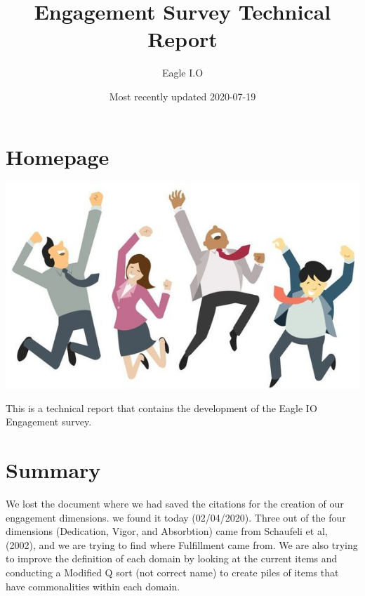 \documentclass[
]{book}
\title{Engagement Survey Technical Report}
\author{Eagle I.O}
\date{Most recently updated 2020-07-19}
\begin{document}
\maketitle

{
\setcounter{tocdepth}{1}
\tableofcontents
}
\hypertarget{Homepage}{%
\chapter*{Homepage}\label{Homepage}}

\includegraphics{EE.jpeg}

This is a technical report that contains the development of the Eagle IO Engagement survey.

\hypertarget{summary}{%
\chapter{Summary}\label{summary}}

We lost the document where we had saved the citations for the creation of our engagement dimensions. we found it today (02/04/2020).
Three out of the four dimensions (Dedication, Vigor, and Absorbtion) came from Schaufeli et al, (2002), and we are trying to find where Fulfillment came from.
We are also trying to improve the definition of each domain by looking at the current items and conducting a Modified Q sort (not correct name) to create piles of items that have commonalities within each domain.

\citet{eagly_psychology_1993}
\citeauthor{simpson_engagement_2009} \citetext{\citeyear{simpson_engagement_2009}; \citealp{harter_business_2002}; \citealp{kahn_psychological_1990}; \citealp{leiter_areas_2003}; \citealp{R-base}; \citealp{R-rmarkdown}; \citealp{rothbard_enriching_2001}; \citealp{saks_antecedents_2006}; \citealp{schaufeli_measurement_2002}; \citealp{simpson_engagement_2009}}
\end{document}
